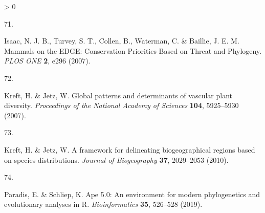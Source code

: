 \documentclass[10pt,oneside]{article}
\newlength{\cslhangindent}
\newlength{\csllabelwidth}
\newenvironment{CSLReferences}[3] %
 {%
  \setlength{\parindent}{0pt}
  \ifodd #1 \everypar{\setlength{\hangindent}{\cslhangindent}}\ignorespaces\fi
  \ifnum #2 > 0
  \setlength{\parskip}{#2\baselineskip}
  \fi
 }%
 {}
\newcommand{\CSLLeftMargin}[1]{\parbox[t]{\maxof{\widthof{#1}}{\csllabelwidth}}{#1}}
\newcommand{\CSLRightInline}[1]{\parbox[t]{\linewidth}{#1}}
\begin{document}
\begin{CSLReferences}{0}{0}
\leavevmode\hypertarget{ref-Isaac2007MamEdg}{}%
\CSLLeftMargin{71. }
\CSLRightInline{Isaac, N. J. B., Turvey, S. T., Collen, B., Waterman, C.
\& Baillie, J. E. M. Mammals on the EDGE: Conservation Priorities Based
on Threat and Phylogeny. \emph{PLOS ONE} \textbf{2}, e296 (2007).}

\leavevmode\hypertarget{ref-Kreft2007GloPat}{}%
\CSLLeftMargin{72. }
\CSLRightInline{Kreft, H. \& Jetz, W. Global patterns and determinants
of vascular plant diversity. \emph{Proceedings of the National Academy
of Sciences} \textbf{104}, 5925--5930 (2007).}

\leavevmode\hypertarget{ref-Kreft2010FraDel}{}%
\CSLLeftMargin{73. }
\CSLRightInline{Kreft, H. \& Jetz, W. A framework for delineating
biogeographical regions based on species distributions. \emph{Journal of
Biogeography} \textbf{37}, 2029--2053 (2010).}

\leavevmode\hypertarget{ref-Paradis2019ApeEnv}{}%
\CSLLeftMargin{74. }
\CSLRightInline{Paradis, E. \& Schliep, K. Ape 5.0: An environment for
modern phylogenetics and evolutionary analyses in R.
\emph{Bioinformatics} \textbf{35}, 526--528 (2019).}

\end{CSLReferences}
\end{document}

